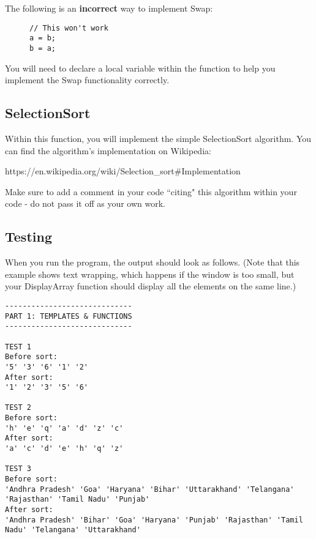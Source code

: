 \documentclass[a4paper,12pt,oneside]{book}
\begin{document}
    The following is an \textbf{incorrect} way to implement Swap:
    
\begin{figure}[h]
\centering
\begin{BVerbatim}
// This won't work
a = b;
b = a;
\end{BVerbatim}
\end{figure}

    You will need to declare
    a local variable within the function to help you implement
    the Swap functionality correctly.


    \subsection{SelectionSort}

    Within this function, you will implement the simple SelectionSort
    algorithm. You can find the algorithm's implementation on Wikipedia:

    https://en.wikipedia.org/wiki/Selection\_sort\#Implementation{}

    Make sure to add a comment in your code ``citing" this algorithm
    within your code - do not pass it off as your own work.


    \subsection{Testing}

    When you run the program, the output should look as follows.
    (Note that this example shows text wrapping, which happens if the
    window is too small, but your DisplayArray function should display
    all the elements on the same line.)

\begin{lstlisting}[style=output]
-----------------------------
PART 1: TEMPLATES & FUNCTIONS
-----------------------------

TEST 1
Before sort: 
'5' '3' '6' '1' '2' 
After sort: 
'1' '2' '3' '5' '6' 

TEST 2
Before sort: 
'h' 'e' 'q' 'a' 'd' 'z' 'c' 
After sort: 
'a' 'c' 'd' 'e' 'h' 'q' 'z' 

TEST 3
Before sort: 
'Andhra Pradesh' 'Goa' 'Haryana' 'Bihar' 'Uttarakhand' 'Telangana' 'Rajasthan' 'Tamil Nadu' 'Punjab' 
After sort: 
'Andhra Pradesh' 'Bihar' 'Goa' 'Haryana' 'Punjab' 'Rajasthan' 'Tamil Nadu' 'Telangana' 'Uttarakhand' 
\end{lstlisting}
    
    
    \newpage{}
\end{document}
